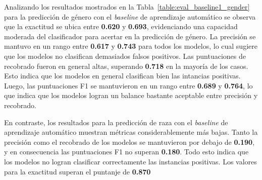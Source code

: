 Analizando los resultados mostrados en la Tabla~\ref{table:eval_baseline1_gender} para la predicci\'on de g\'enero con el 
\emph{baseline} de aprendizaje autom\'atico se observa que la exactitud se ubica entre \textbf{0.620} y \textbf{0.693}, 
evidenciando una capacidad moderada del clasificador para acertar en la predicci\'on de g\'enero. La precisi\'on se 
mantuvo en un rango entre \textbf{0.617} y \textbf{0.743} para todos los modelos, lo cual sugiere que los modelos no
clasifican demasiados falsos positivos. Las puntuaciones de recobrado fueron en general altas, superando \textbf{0.718}
en la mayor\'ia de los casos. Esto indica que los modelos en general clasifican bien las intancias positivas. Luego, las 
puntuaciones F1 se mantuvieron en un rango entre \textbf{0.689} y \textbf{0.764}, lo que indica que los modelos logran
un balance bastante aceptable entre precisi\'on y recobrado.

En contraste, los resultados para la predicci\'on de raza con el \emph{baseline} de aprendizaje autom\'atico 
muestran m\'etricas considerablemente m\'as bajas. Tanto la precisi\'on como el recobrado de los modelos se
mantuvieron por debajo de \textbf{0.190}, y en consecuencia las puntuaciones F1 no superan \textbf{0.180}. Todo
esto indica que los modelos no logran clasificar correctamente las instancias positivas. Los valores para la 
exactitud superan el puntanje de \textbf{0.870}  